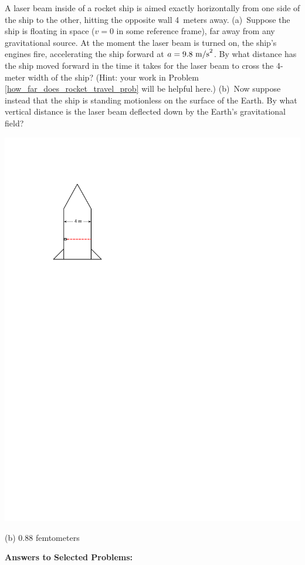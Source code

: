 \begin{minipage}{0.75 \textwidth}
\begin{Exercise}[difficulty=0]
A laser beam inside of a rocket ship is aimed exactly horizontally from one side of the ship to the other, hitting the opposite wall 4~meters away.  (a)~Suppose the ship is floating in space ($v=0$ in some reference frame), far away from any gravitational source.  At the moment the laser beam is turned on, the ship's engines fire, accelerating the ship forward at $a=9.8~{\rm m/s}^2$.  By what distance has the ship moved forward in the time it takes for the laser beam to cross the 4-meter width of the ship? (Hint: your work in Problem \ref{how_far_does_rocket_travel_prob} will be helpful here.)  (b)~Now suppose instead that the ship is standing motionless on the surface of the Earth.  By what vertical distance is the laser beam deflected down by the Earth's gravitational field?
\vspace{0.5in}
\end{Exercise}
\end{minipage}
\begin{minipage}{0.24 \textwidth}
\medskip
\hspace{\fill}\includegraphics[scale=0.9]{M_problems/gravity/rocket_and_horizontal_laser.pdf}
\end{minipage}
\begin{Answer}
(b) 0.88 femtometers
\end{Answer}





\bigskip\bigskip\bigskip
\pagebreak[3]
\textbf{Answers to Selected {\thesubsection} Problems:}
\label{gravity_prob_answers}
\shipoutAnswer

\cleardoublepage